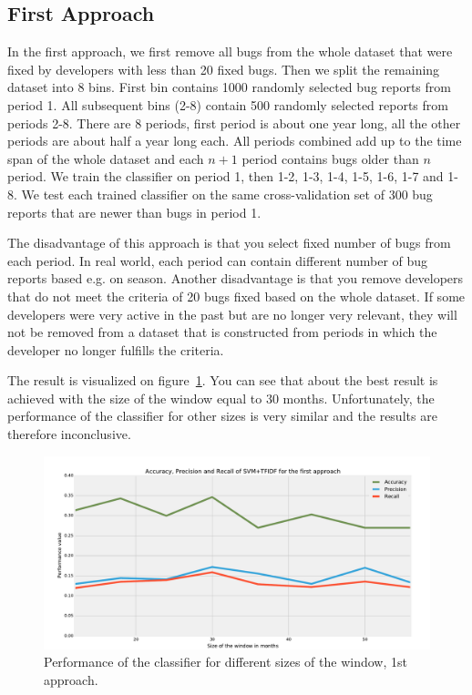 \subsection{First Approach}

In the first approach, we first remove all bugs from the whole dataset that were fixed by developers with less than 20 fixed bugs. Then we split the remaining dataset into 8 bins. First bin contains 1000 randomly selected bug reports from period 1. All subsequent bins (2-8) contain 500 randomly selected reports from periods 2-8. There are 8 periods, first period is about one year long, all the other periods are about half a year long each. All periods combined add up to the time span of the whole dataset and each $n+1$ period contains bugs older than $n$ period. We train the classifier on period 1, then 1-2, 1-3, 1-4, 1-5, 1-6, 1-7 and 1-8. We test each trained classifier on the same cross-validation set of 300 bug reports that are newer than bugs in period 1.

The disadvantage of this approach is that you select fixed number of bugs from each period. In real world, each period can contain different number of bug reports based e.g. on season. Another disadvantage is that you remove developers that do not meet the criteria of 20 bugs fixed based on the whole dataset. If some developers were very active in the past but are no longer very relevant, they will not be removed from a dataset that is constructed from periods in which the developer no longer fulfills the criteria.

The result is visualized on figure~\ref{fig:window.firefox.1a}. You can see that about the best result is achieved with the size of the window equal to 30 months. Unfortunately, the performance of the classifier for other sizes is very similar and the results are therefore inconclusive.

\begin{figure}[htbp]
    \centering
        \includegraphics[width=\textwidth]{./images/window_size/firefox_1a.pdf}
    \caption{Performance of the classifier for different sizes of the window, 1st approach.}
    \label{fig:window.firefox.1a}
\end{figure}

